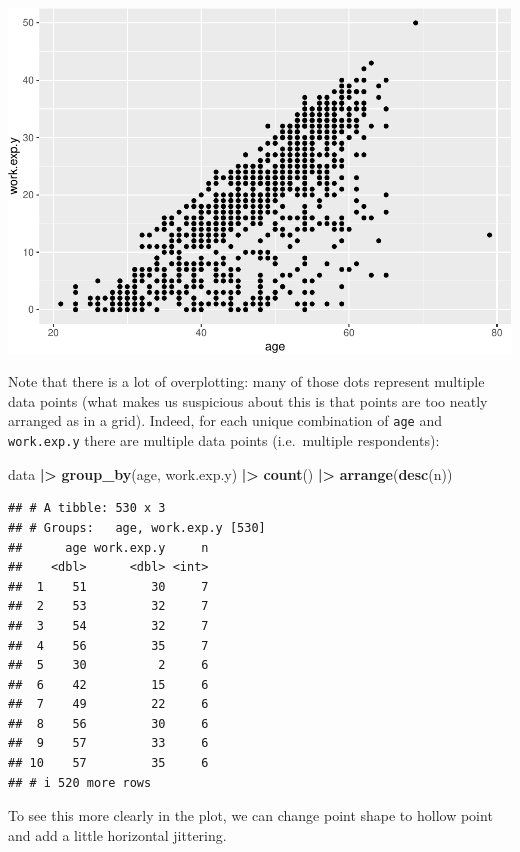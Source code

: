 \documentclass[
]{book}
\newenvironment{Shaded}{\begin{snugshade}}{\end{snugshade}}
\newcommand{\FunctionTok}[1]{\textcolor[rgb]{0.13,0.29,0.53}{\textbf{#1}}}
\newcommand{\NormalTok}[1]{#1}
\newcommand{\SpecialCharTok}[1]{\textcolor[rgb]{0.81,0.36,0.00}{\textbf{#1}}}
\begin{document}
\includegraphics{R-for-social-research-and-business-analytics_files/figure-latex/unnamed-chunk-29-1.pdf}

Note that there is a lot of overplotting: many of those dots represent multiple data points (what makes us suspicious about this is that points are too neatly arranged as in a grid). Indeed, for each unique combination of \texttt{age} and \texttt{work.exp.y} there are multiple data points (i.e.~multiple respondents):

\begin{Shaded}
\begin{Highlighting}[]
\NormalTok{data }\SpecialCharTok{|\textgreater{}} 
  \FunctionTok{group\_by}\NormalTok{(age, work.exp.y) }\SpecialCharTok{|\textgreater{}} 
  \FunctionTok{count}\NormalTok{() }\SpecialCharTok{|\textgreater{}} 
  \FunctionTok{arrange}\NormalTok{(}\FunctionTok{desc}\NormalTok{(n))}
\end{Highlighting}
\end{Shaded}

\begin{verbatim}
## # A tibble: 530 x 3
## # Groups:   age, work.exp.y [530]
##      age work.exp.y     n
##    <dbl>      <dbl> <int>
##  1    51         30     7
##  2    53         32     7
##  3    54         32     7
##  4    56         35     7
##  5    30          2     6
##  6    42         15     6
##  7    49         22     6
##  8    56         30     6
##  9    57         33     6
## 10    57         35     6
## # i 520 more rows
\end{verbatim}

To see this more clearly in the plot, we can change point shape to hollow point and add a little horizontal jittering.
\end{document}
